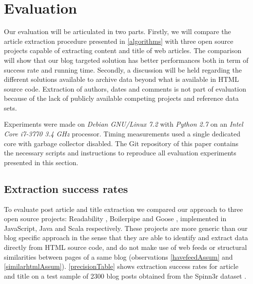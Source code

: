 \section{Evaluation}

Our evaluation will be articulated in two parts. Firstly, we will compare the article extraction procedure presented in \autoref{algorithms} with three open source projects capable of extracting content and title of web articles. The comparison will show that our blog targeted solution has better performances both in term of success rate and running time. Secondly, a discussion will be held regarding the different solutions available to archive data beyond what is available in HTML source code. Extraction of authors, dates and comments is not part of evaluation because of the lack of publicly available competing projects and reference data sets.

Experiments were made on \emph{Debian GNU/Linux 7.2} with \emph{Python 2.7} on an \emph{Intel Core i7-3770 3.4 GHz} processor. Timing measurements used a single dedicated core with garbage collector disabled. The Git repository of this paper \cite{repositoryofthispaper} contains the necessary scripts and instructions to reproduce all evaluation experiments presented in this section.


\subsection{Extraction success rates}
To evaluate post article and title extraction we compared our approach to three open source projects: Readability \cite{python-readability2011}, Boilerpipe \cite{kohlschuetter2010} and Goose \cite{goose2012}, implemented in JavaScript, Java and Scala respectively. These projects are more generic than our blog specific approach in the sense that they are able to identify and extract data directly from HTML source code, and do not make use of web feeds or structural similarities between pages of a same blog (observations \ref{havefeedAssum} and \ref{similarhtmlAssum}). \autoref{precisionTable} shows extraction success rates for article and title on a test sample of 2300 blog posts obtained from the Spinn3r dataset \cite{burton2011}.


\precisionTable


